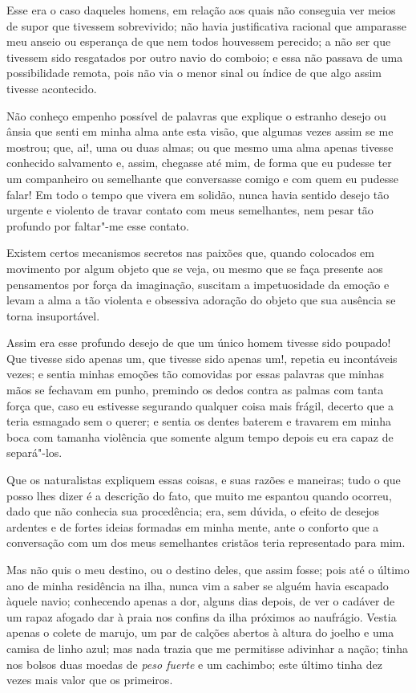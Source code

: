 Esse era o caso daqueles homens, em relação aos quais não conseguia ver
meios de supor que tivessem sobrevivido; não havia justificativa
racional que amparasse meu anseio ou esperança de que nem todos
houvessem perecido; a não ser que tivessem sido resgatados por outro
navio do comboio; e essa não passava de uma possibilidade remota, pois
não via o menor sinal ou índice de que algo assim tivesse acontecido.

Não conheço empenho possível de palavras que explique o estranho desejo
ou ânsia que senti em minha alma ante esta visão, que algumas vezes
assim se me mostrou; que, ai!, uma ou duas almas; ou que mesmo uma alma
apenas tivesse conhecido salvamento e, assim, chegasse até mim, de forma
que eu pudesse ter um companheiro ou semelhante que conversasse comigo e
com quem eu pudesse falar! Em todo o tempo que vivera em solidão, nunca
havia sentido desejo tão urgente e violento de travar contato com meus
semelhantes, nem pesar tão profundo por faltar"-me esse contato.

Existem certos mecanismos secretos nas paixões que, quando colocados em
movimento por algum objeto que se veja, ou mesmo que se faça presente
aos pensamentos por força da imaginação, suscitam a impetuosidade da
emoção e levam a alma a tão violenta e obsessiva adoração do objeto que
sua ausência se torna insuportável.

Assim era esse profundo desejo de que um único homem tivesse sido
poupado! Que tivesse sido apenas um, que tivesse sido apenas um!,
repetia eu incontáveis vezes; e sentia minhas emoções tão comovidas por
essas palavras que minhas mãos se fechavam em punho, premindo os dedos
contra as palmas com tanta força que, caso eu estivesse segurando
qualquer coisa mais frágil, decerto que a teria esmagado sem o querer; e
sentia os dentes baterem e travarem em minha boca com tamanha violência
que somente algum tempo depois eu era capaz de separá"-los.

Que os naturalistas expliquem essas coisas, e suas razões e maneiras;
tudo o que posso lhes dizer é a descrição do fato, que muito me espantou
quando ocorreu, dado que não conhecia sua procedência; era, sem dúvida,
o efeito de desejos ardentes e de fortes ideias formadas em minha mente,
ante o conforto que a conversação com um dos meus semelhantes cristãos
teria representado para mim.

Mas não quis o meu destino, ou o destino deles, que assim fosse; pois
até o último ano de minha residência na ilha, nunca vim a saber se
alguém havia escapado àquele navio; conhecendo apenas a dor, alguns dias
depois, de ver o cadáver de um rapaz afogado dar à praia nos confins da
ilha próximos ao naufrágio. Vestia apenas o colete de marujo, um par de
calções abertos à altura do joelho e uma camisa de linho azul; mas nada
trazia que me permitisse adivinhar a nação; tinha nos bolsos duas moedas
de \emph{peso fuerte} e um cachimbo; este último tinha dez vezes mais
valor que os primeiros.

